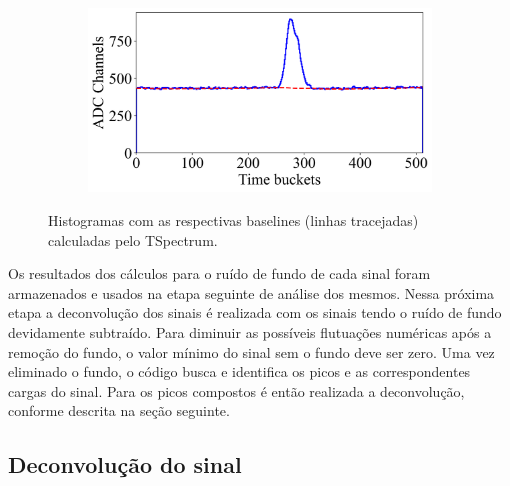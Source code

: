 \documentclass[a4paper,12pt,oneside]{book}
\begin{document}
\begin{figure}[H]
\begin{subfigure}[b]{0.48\textwidth}
        \caption{}
        \label{subfig:ex_sinal_bkg_3}
    \end{subfigure}%
    \hfill
    \begin{subfigure}[b]{0.48\textwidth}
        \centering
        \includegraphics[scale=0.394]{figs/ex_sinal_bkg_4.png}
        \caption{}
        \label{subfig:ex_sinal_bkg_4}
    \end{subfigure}
\caption{Histogramas com as respectivas baselines (linhas tracejadas) calculadas pelo TSpectrum.}
\label{fig:ex_sinal_bkg}
\end{figure}

\par Os resultados dos cálculos para o ruído de fundo de cada sinal foram armazenados e usados na etapa seguinte de análise dos mesmos. Nessa próxima etapa a deconvolução dos sinais é realizada com os sinais tendo o ruído de fundo devidamente subtraído. Para diminuir as possíveis flutuações numéricas após a remoção do fundo, o valor mínimo do sinal sem o fundo deve ser zero. Uma vez eliminado o fundo, o código busca e identifica os picos e as correspondentes cargas do sinal. Para os picos compostos é então realizada a deconvolução, conforme descrita na seção seguinte.




\subsection{Deconvolução do sinal}\label{subsec:pulses_deconv}
\end{document}
